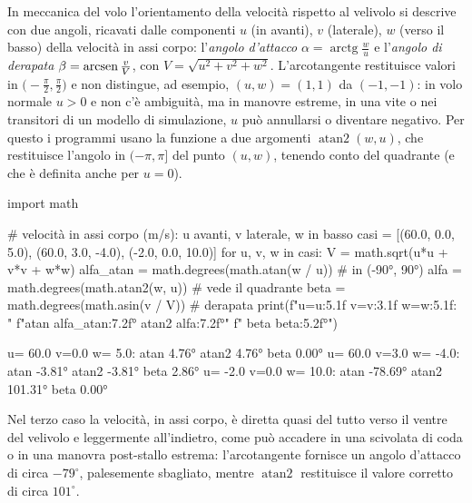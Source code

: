 \begin{idea}
In meccanica del volo l'orientamento della velocità rispetto al velivolo si descrive con
due angoli, ricavati dalle componenti $u$ (in avanti), $v$ (laterale), $w$ (verso il basso)
della velocità in assi corpo: l'\emph{angolo d'attacco} $\alpha=\operatorname{arctg}\frac wu$ e
l'\emph{angolo di derapata} $\beta=\operatorname{arcsen}\frac vV$, con $V=\sqrt{u^{2}+v^{2}+w^{2}}$.
L'arcotangente restituisce valori in $\bigl(-\frac\pi2,\frac\pi2\bigr)$ e non distingue,
ad esempio, $(u,w)=(1,1)$ da $(-1,-1)$: in volo normale $u>0$ e non c'è ambiguità, ma in
manovre estreme, in una vite o nei transitori di un modello di simulazione, $u$ può
annullarsi o diventare negativo. Per questo i programmi usano la funzione a due argomenti
$\operatorname{atan2}(w,u)$, che restituisce l'angolo in $(-\pi,\pi]$ del punto $(u,w)$,
tenendo conto del quadrante (e che è definita anche per $u=0$).
\end{idea}

\begin{python}
import math

# velocità in assi corpo (m/s): u avanti, v laterale, w in basso
casi = [(60.0, 0.0, 5.0), (60.0, 3.0, -4.0), (-2.0, 0.0, 10.0)]
for u, v, w in casi:
    V = math.sqrt(u*u + v*v + w*w)
    alfa_atan = math.degrees(math.atan(w / u))  # in (-90°, 90°)
    alfa = math.degrees(math.atan2(w, u))       # vede il quadrante
    beta = math.degrees(math.asin(v / V))       # derapata
    print(f"u={u:5.1f} v={v:3.1f} w={w:5.1f}: "
          f"atan {alfa_atan:7.2f}°  atan2 {alfa:7.2f}°"
          f"  beta {beta:5.2f}°")
\end{python}
\begin{risultato}
u= 60.0 v=0.0 w=  5.0: atan    4.76°  atan2    4.76°  beta  0.00°
u= 60.0 v=3.0 w= -4.0: atan   -3.81°  atan2   -3.81°  beta  2.86°
u= -2.0 v=0.0 w= 10.0: atan  -78.69°  atan2  101.31°  beta  0.00°
\end{risultato}

Nel terzo caso la velocità, in assi corpo, è diretta quasi del tutto verso il ventre del
velivolo e leggermente all'indietro, come può accadere in una scivolata di coda o in
una manovra post-stallo estrema: l'arcotangente fornisce un
angolo d'attacco di circa $-79^{\circ}$, palesemente sbagliato, mentre $\operatorname{atan2}$
restituisce il valore corretto di circa $101^{\circ}$.

